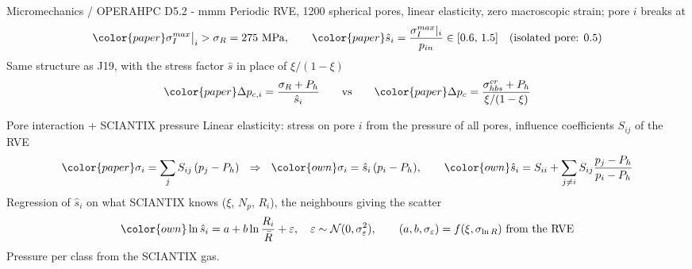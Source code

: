 \documentclass[10pt,aspectratio=169]{beamer}
\newcommand{\pp}[1]{{\color{paper}#1}}   %
\newcommand{\oo}[1]{{\color{own}#1}}     %
\begin{document}


\begin{frame}{Micromechanics / OPERAHPC D5.2 - mmm}
Periodic RVE, 1200 spherical pores, linear elasticity, zero macroscopic strain; pore $i$ breaks at
\[
\pp{\sigma_I^{max}\big|_i>\sigma_R=275\ \mathrm{MPa}},\qquad
\pp{\hat s_i=\frac{\sigma_I^{max}|_i}{p_{in}}\in[0.6,\,1.5]}\quad(\text{isolated pore: }0.5)
\]
Same structure as J19, with the stress factor $\hat s$ in place of $\xi/(1-\xi)$
\[
\pp{\Delta p_{c,i}=\frac{\sigma_R+P_h}{\hat s_i}}\qquad\text{vs}\qquad
\pp{\Delta p_c=\frac{\sigma^{cr}_{hbs}+P_h}{\xi/(1-\xi)}}
\]
\centering\small

\end{frame}

\begin{frame}{Pore interaction + SCIANTIX pressure}
\small
Linear elasticity: stress on pore $i$ from the pressure of all pores, influence coefficients $S_{ij}$ of the RVE
\[
\pp{\sigma_i=\sum_j S_{ij}\,(p_j-P_h)}\ \ \Rightarrow\ \ \oo{\sigma_i=\hat s_i\,(p_i-P_h)},\qquad \oo{\hat s_i=S_{ii}+\sum_{j\ne i}S_{ij}\frac{p_j-P_h}{p_i-P_h}}
\]
Regression of $\hat s_i$ on what SCIANTIX knows ($\xi$, $N_p$, $R_i$), the neighbours giving the scatter
\[
\oo{\ln\hat s_i=a+b\ln\frac{R_i}{\bar R}+\varepsilon,\quad \varepsilon\sim\mathcal N(0,\sigma_\varepsilon^2),\qquad (a,b,\sigma_\varepsilon)=f(\xi,\sigma_{\ln R})\ \text{from the RVE}}
\]
Pressure per class from the SCIANTIX gas.
\end{frame}
\end{document}
